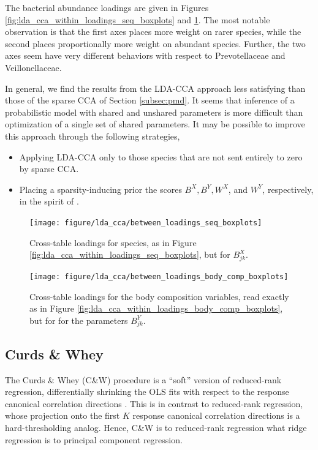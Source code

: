\documentclass{article}
\begin{document}
The bacterial abundance loadings are given in Figures
\ref{fig:lda_cca_within_loadings_seq_boxplots} and
\ref{fig:lda_cca_between_loadings_seq_boxplots}. The most notable observation is
that the first axes places more weight on rarer species, while the second places
proportionally more weight on abundant species. Further, the two axes seem have
very different behaviors with respect to Prevotellaceae and Veillonellaceae.

In general, we find the results from the LDA-CCA approach less satisfying than
those of the sparse CCA of Section \ref{subsec:pmd}. It seems that inference of
a probabilistic model with shared and unshared parameters is more difficult than
optimization of a single set of shared parameters. It may be possible to improve
this approach through the following strategies,
\begin{itemize}
\item Applying LDA-CCA only to those species that are not sent entirely to zero by
  sparse CCA.
\item Placing a sparsity-inducing prior the scores $B^{X}, B^{Y}, W^{X}$, and
  $W^{Y}$, respectively, in the spirit of \citep{archambeau2009sparse}.
\end{itemize}

\begin{figure}
  \centering
  \texttt{[image: figure/lda\_cca/between\_loadings\_seq\_boxplots]}
  \caption{Cross-table loadings for species, as in
    Figure \ref{fig:lda_cca_within_loadings_seq_boxplots}, but for
    $B^{X}_{jk}$. \label{fig:lda_cca_between_loadings_seq_boxplots} }
\end{figure}

\begin{figure}
  \centering
  \texttt{[image: figure/lda\_cca/between\_loadings\_body\_comp\_boxplots]}
  \caption{Cross-table loadings for the body composition variables, read exactly
    as in Figure \ref{fig:lda_cca_within_loadings_body_comp_boxplots}, but for for the
    parameters
    $B^{Y}_{jk}$. \label{fig:lda_cca_between_loadings_body_comp_boxplots}}
\end{figure}

\subsection{Curds \& Whey}
\label{subsec:cw}

The Curds \& Whey (C\&W) procedure is a ``soft'' version of reduced-rank
regression, differentially shrinking the OLS fits with respect to the response
canonical correlation directions \citep{breiman1997predicting}. This is in
contrast to reduced-rank regression, whose projection onto the first $K$
response canonical correlation directions is a hard-thresholding analog. Hence,
C\&W is to reduced-rank regression what ridge regression is to principal
component regression.
\end{document}
